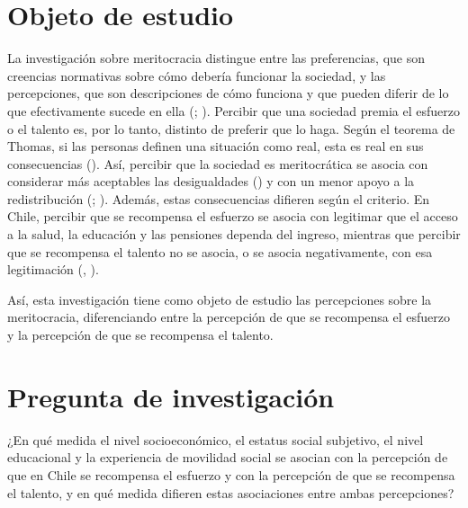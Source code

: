 \documentclass[
  spanish,
  a4paper,
  oneside]{scrbook}
\begin{document}
\section{Objeto de estudio}\label{objeto-de-estudio-1}

La investigación sobre meritocracia distingue entre las preferencias,
que son creencias normativas sobre cómo debería funcionar la sociedad, y
las percepciones, que son descripciones de cómo funciona y que pueden
diferir de lo que efectivamente sucede en ella
(;
).
Percibir que una sociedad premia el esfuerzo o el talento es, por lo
tanto, distinto de preferir que lo haga. Según el teorema de Thomas, si
las personas definen una situación como real, esta es real en sus
consecuencias ().
Así, percibir que la sociedad es meritocrática se asocia con considerar
más aceptables las desigualdades () y con un menor apoyo a la redistribución
(;
). Además, estas consecuencias difieren según el criterio. En
Chile, percibir que se recompensa el esfuerzo se asocia con legitimar
que el acceso a la salud, la educación y las pensiones dependa del
ingreso, mientras que percibir que se recompensa el talento no se
asocia, o se asocia negativamente, con esa legitimación
(,
).

Así, esta investigación tiene como objeto de estudio las percepciones
sobre la meritocracia, diferenciando entre la percepción de que se
recompensa el esfuerzo y la percepción de que se recompensa el talento.

\section{Pregunta de
investigación}\label{pregunta-de-investigaciuxf3n-1}

¿En qué medida el nivel socioeconómico, el estatus social subjetivo, el
nivel educacional y la experiencia de movilidad social se asocian con la
percepción de que en Chile se recompensa el esfuerzo y con la percepción
de que se recompensa el talento, y en qué medida difieren estas
asociaciones entre ambas percepciones?
\end{document}
